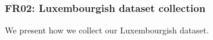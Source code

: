 \subsubsection{FR02: Luxembourgish dataset collection}

We present how we collect our Luxembourgish dataset.
